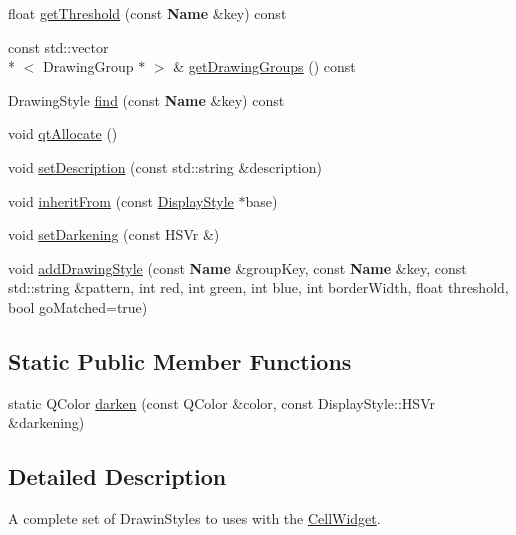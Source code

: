 \begin{DoxyCompactItemize}
\item 
float \hyperlink{classHurricane_1_1DisplayStyle_adbe5d39421a1ba4de0827ef0d94b5cc3}{get\-Threshold} (const {\bf Name} \&key) const 
\item 
const std\-::vector\\*
$<$ Drawing\-Group $\ast$ $>$ \& \hyperlink{classHurricane_1_1DisplayStyle_a16dc39d596aafbee0c4f9d6e2c61de7d}{get\-Drawing\-Groups} () const 
\item 
Drawing\-Style \hyperlink{classHurricane_1_1DisplayStyle_a592d29b7fdb5d5941119f5cfdb3b8be6}{find} (const {\bf Name} \&key) const 
\item 
void \hyperlink{classHurricane_1_1DisplayStyle_a9288b2780ffd5fccf94a41b597ed2efd}{qt\-Allocate} ()
\item 
void \hyperlink{classHurricane_1_1DisplayStyle_ae21071635857843536511f21da5533c7}{set\-Description} (const std\-::string \&description)
\item 
void \hyperlink{classHurricane_1_1DisplayStyle_a603dbd5d6973a8897a85513acdfda2d0}{inherit\-From} (const \hyperlink{classHurricane_1_1DisplayStyle}{Display\-Style} $\ast$base)
\item 
void \hyperlink{classHurricane_1_1DisplayStyle_ab17b746af2c529c62a902d0cb992be34}{set\-Darkening} (const H\-S\-Vr \&)
\item 
void \hyperlink{classHurricane_1_1DisplayStyle_aef2473891e0de472850f95cbd71b2cf4}{add\-Drawing\-Style} (const {\bf Name} \&group\-Key, const {\bf Name} \&key, const std\-::string \&pattern, int red, int green, int blue, int border\-Width, float threshold, bool go\-Matched=true)
\end{DoxyCompactItemize}
\subsection*{Static Public Member Functions}
\begin{DoxyCompactItemize}
\item 
static Q\-Color \hyperlink{classHurricane_1_1DisplayStyle_ab19987c4a2d971163749b7ab56b5597b}{darken} (const Q\-Color \&color, const Display\-Style\-::\-H\-S\-Vr \&darkening)
\end{DoxyCompactItemize}


\subsection{Detailed Description}
A complete set of Drawin\-Styles to uses with the \hyperlink{classHurricane_1_1CellWidget}{Cell\-Widget}. 

